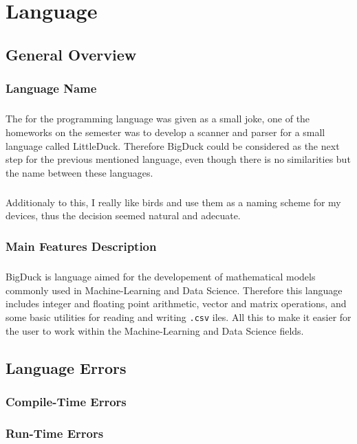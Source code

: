 
\chapter{Language}

\section{General Overview}
\subsection{Language Name}
\paragraph{} The for the programming language was given as a small joke, one of
the homeworks on the semester was to develop a scanner and parser for a small
language called LittleDuck. Therefore BigDuck could be considered as the next
step for the previous mentioned language, even though there is no similarities
but the name between these languages.

\paragraph{} Additionaly to this, I really like birds and use them as a naming
scheme for my devices, thus the decision seemed natural and adecuate.

\subsection{Main Features Description}
\paragraph{} BigDuck is language aimed for the developement of mathematical
models commonly used in Machine-Learning and Data Science. Therefore this
language includes integer and floating point arithmetic, vector and matrix
operations, and some basic utilities for reading and writing \texttt{.csv} 
iles. All this to make it easier for the user to work within the
Machine-Learning and Data Science fields.


\section{Language Errors}
\subsection{Compile-Time Errors}
\subsection{Run-Time Errors}


